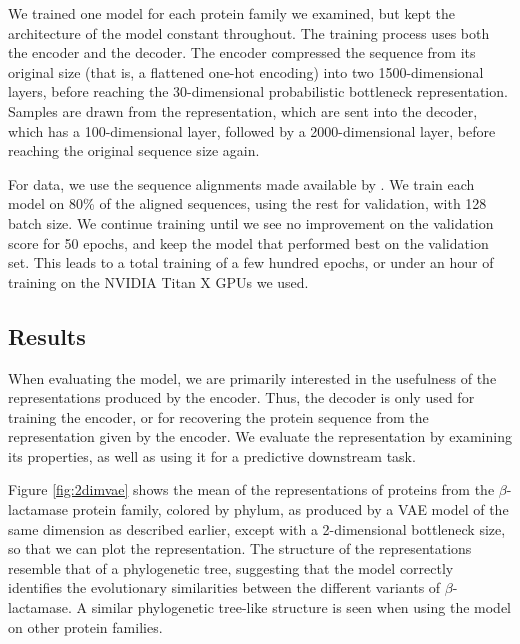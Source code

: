 We trained one model for each protein family we examined, but kept the architecture of the model constant throughout. The training process uses both the encoder and the decoder. The encoder compressed the sequence from its original size (that is, a flattened one-hot encoding) into two 1500-dimensional layers, before reaching the 30-dimensional probabilistic bottleneck representation. Samples are drawn from the representation, which are sent into the decoder, which has a 100-dimensional layer, followed by a 2000-dimensional layer, before reaching the original sequence size again.

For data, we use the sequence alignments made available by \cite{riesselman2018deep}. We train each model on 80\% of the aligned sequences, using the rest for validation, with 128 batch size. We continue training until we see no improvement on the validation score for 50 epochs, and keep the model that performed best on the validation set. This leads to a total training of a few hundred epochs, or under an hour of training on the NVIDIA Titan X GPUs we used.

\subsection{Results}
When evaluating the model, we are primarily interested in the usefulness of the representations produced by the encoder. Thus, the decoder is only used for training the encoder, or for recovering the protein sequence from the representation given by the encoder. We evaluate the representation by examining its properties, as well as using it for a predictive downstream task.

Figure \ref{fig:2dimvae} shows the mean of the representations of proteins from the $\beta$-lactamase protein family, colored by phylum, as produced by a VAE model of the same dimension as described earlier, except with a 2-dimensional bottleneck size, so that we can plot the representation. The structure of the representations resemble that of a phylogenetic tree, suggesting that the model correctly identifies the evolutionary similarities between the different variants of $\beta$-lactamase. A similar phylogenetic tree-like structure is seen when using the model on other protein families.

